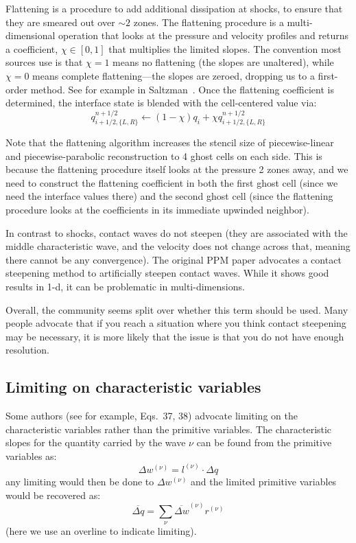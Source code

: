   Flattening is a procedure to add additional dissipation at shocks,
  to ensure that they are smeared out over $\sim 2$ zones.  The
  flattening procedure is a multi-dimensional operation that looks at
  the pressure and velocity profiles and returns a coefficient, $\chi
  \in [0,1]$ that multiplies the limited slopes.  The convention most
  sources use is that $\chi = 1$ means no flattening (the slopes are
  unaltered), while $\chi = 0$ means complete flattening---the slopes
  are zeroed, dropping us to a first-order method.
  See for example in Saltzman~\cite{saltzman:1994}.  Once the flattening
  coefficient is determined, the interface state is blended with the
  cell-centered value via:
  \begin{equation}
  q_{i+1/2,\{L,R\}}^{n+1/2} \leftarrow (1 - \chi) q_i + \chi q_{i+1/2,\{L,R\}}^{n+1/2}
  \end{equation}

  Note that the flattening algorithm increases the stencil size of
  piecewise-linear and piecewise-parabolic reconstruction to 4 ghost cells
  on each side.  This is because the flattening procedure itself looks
  at the pressure 2 zones away, and we need to construct the flattening
  coefficient in both the first ghost cell (since we need the interface
  values there) and the second ghost cell (since the flattening procedure
  looks at the coefficients in its immediate upwinded neighbor).

  In contrast to shocks, contact waves
  do not steepen (they are associated with the middle characteristic
  wave, and the velocity does not change across that, meaning there
  cannot be any convergence).  The original PPM
  paper advocates a contact steepening method to artificially steepen
  contact waves.  While it shows good results in 1-d, it can be
  problematic in multi-dimensions.

  Overall, the community seems split over whether this term should be
  used.  Many people advocate that if you reach a situation where you
  think contact steepening may be necessary, it is more likely that
  the issue is that you do not have enough resolution.


\subsection{Limiting on characteristic variables}

  Some authors (see for example, \cite{athena} Eqs.~37, 38) advocate
  limiting on the characteristic variables rather than the primitive
  variables.  The characteristic slopes for the quantity carried by
  the wave $\nu$ can be found from the primitive variables
  as: \begin{equation} \Delta w^{(\nu)} = l^{(\nu)} \cdot \Delta
  q \end{equation} any limiting would then be done to $\Delta
  w^{(\nu)}$ and the limited primitive variables would be recovered
  as: \begin{equation} \overline{\Delta q} = \sum_\nu \overline{\Delta
  w}^{(\nu)} r^{(\nu)} \end{equation} (here we use an overline to
  indicate limiting).

